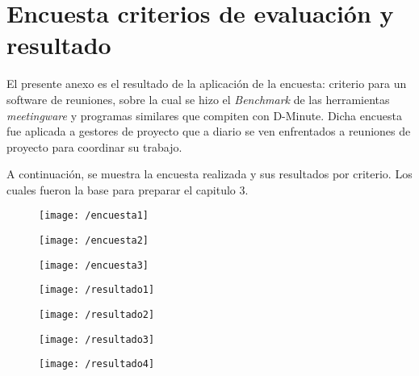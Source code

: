 \appendix
\clearpage
\addappheadtotoc
\appendixpage
\section{Encuesta criterios de evaluación y resultado}

El presente anexo es el resultado de la aplicación de la encuesta: criterio para un software de reuniones, sobre la cual se hizo el \textit{Benchmark} de las herramientas \textit{meetingware} y programas similares que compiten con D-Minute. Dicha encuesta fue aplicada a gestores de proyecto que a diario se ven enfrentados a reuniones de proyecto para coordinar su trabajo.

A continuación, se muestra la encuesta realizada y sus resultados por criterio. Los cuales fueron la base para preparar el capitulo 3. 

\begin{figure}[h]
\centering
\texttt{[image: /encuesta1]}
\end{figure}

\begin{figure}[h]
\centering
\texttt{[image: /encuesta2]}
\end{figure}

\begin{figure}[h]
\centering
\texttt{[image: /encuesta3]}
\end{figure}

\begin{figure}[h]
\centering
\texttt{[image: /resultado1]}
\end{figure}

\begin{figure}[h]
\centering
\texttt{[image: /resultado2]}
\end{figure}

\begin{figure}[h]
\centering
\texttt{[image: /resultado3]}
\end{figure}

\begin{figure}[h]
\centering
\texttt{[image: /resultado4]}
\end{figure}
